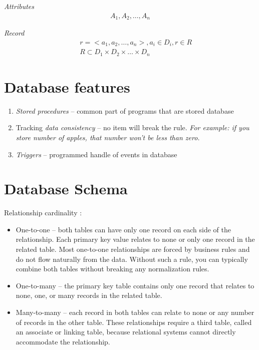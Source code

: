 {\it Attributes}
\begin{eqnarray*}
    A_{1}, A_{2},\ldots,A_{n}
\end{eqnarray*}

{\it Record}
\begin{eqnarray*}
    &&r=<a_{1},a_{2},\ldots,a_{n}>, a_{i}\in D_{i}, r\in R\\
    &&R\subset D_{1}\times D_{2}\times\ldots\times D_{n}
\end{eqnarray*}


\section{Database features}

\begin{enumerate}
    \item {\it Stored procedures} -- common part of
        programs that are stored database
    \item Tracking {\it data consistency} -- no item
        will break the rule.  {\it For example: if you store number of apples,
        that number won't be less than zero.}
    \item {\it Triggers} -- programmed handle of events in
        database
\end{enumerate}

\section{Database Schema}

Relationship cardinality \cite{database-relationships}:

\begin{itemize}
    \item One-to-one -- both tables can have only one record on each side of the
        relationship. Each primary key value relates to none or only one record
        in the related table.
        \subitem Most one-to-one relationships are forced
        by business rules and do not flow naturally from the data. Without such
        a rule, you can typically combine both tables without breaking any
        normalization rules.
    \item One-to-many -- the primary key table contains only one record that
        relates to none, one, or many records in the related table.
    \item Many-to-many -- each record in both tables can relate to none or any
        number of records in the other table. These relationships require a
        third table, called an associate or linking table, because relational
        systems cannot directly accommodate the relationship.
\end{itemize}


